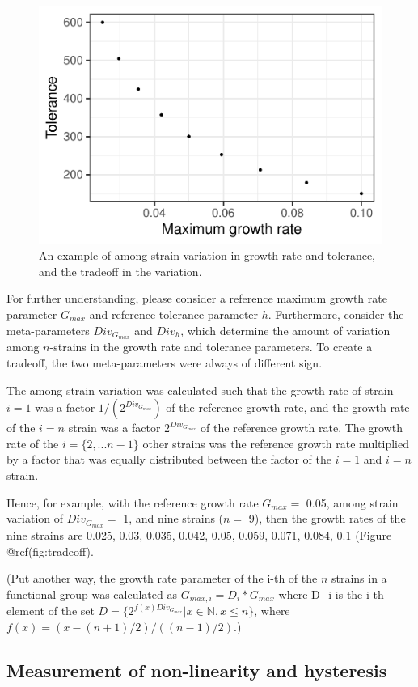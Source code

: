\documentclass{article}
\begin{document}
\begin{figure}

{\centering \includegraphics[width=0.5\linewidth]{article_files/figure-latex/tradeoff-1} 

}

\caption{An example of among-strain variation in growth rate and tolerance, and the tradeoff in the variation.}\label{fig:tradeoff}
\end{figure}

For further understanding, please consider a reference maximum growth
rate parameter \(G_{max}\) and reference tolerance parameter \(h\).
Furthermore, consider the meta-parameters \(Div_{G_{max}}\) and
\(Div_{h}\), which determine the amount of variation among \(n\)-strains
in the growth rate and tolerance parameters. To create a tradeoff, the
two meta-parameters were always of different sign.

The among strain variation was calculated such that the growth rate of
strain \(i = 1\) was a factor \(1/(2^{Div_{G_{max}}})\) of the reference
growth rate, and the growth rate of the \(i = n\) strain was a factor
\(2^{Div_{G_{max}}}\) of the reference growth rate. The growth rate of
the \(i = \{2,...n-1\}\) other strains was the reference growth rate
multiplied by a factor that was equally distributed between the factor
of the \(i = 1\) and \(i = n\) strain.

Hence, for example, with the reference growth rate \(G_{max} =\) 0.05,
among strain variation of \(Div_{G_{max}} =\) 1, and nine strains
(\(n =\) 9), then the growth rates of the nine strains are 0.025, 0.03,
0.035, 0.042, 0.05, 0.059, 0.071, 0.084, 0.1 (Figure @ref(fig:tradeoff).

(Put another way, the growth rate parameter of the i-th of the \(n\)
strains in a functional group was calculated as
\(G_{max, i} = D_i * G_{max}\) where D\_i is the i-th element of the set
\(D = \{2^{f(x)Div_{G_{max}}} | x \in \mathbb{N}, x \leq n\}\), where
\(f(x) = (x-(n+1)/2) / (( n-1)/2)\).)

\hypertarget{measurement-of-non-linearity-and-hysteresis}{%
\subsection{Measurement of non-linearity and
hysteresis}\label{measurement-of-non-linearity-and-hysteresis}}
\end{document}
